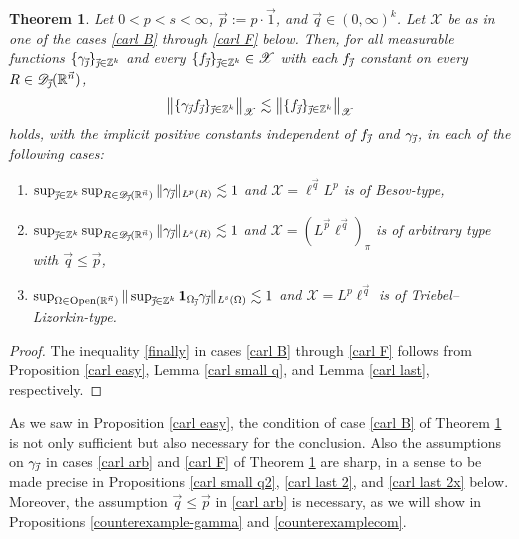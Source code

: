 \documentclass[11pt, reqno]{amsart}
\newtheorem{theorem}{Theorem}[section]
\theoremstyle{definition}
\theoremstyle{remark}
\numberwithin{equation}{section}
\newcommand{\D}{\mathscr D}
\newcommand{\R}{\mathbb R}
\newcommand{\Xs}{\mathscr X}
\newcommand{\vone}{\vec 1}
\newcommand{\vj}{\vec{\textit{\j}}}
\newcommand{\vn}{\vec n}
\newcommand{\vp}{\vec p}
\newcommand{\vq}{\vec q}
\newcommand{\one}{\mathbf{1}}
\newcommand{\aveL}{\textit{\L}}
\newcommand{\Norm}[2]{\|#1\|_{#2}}
\newcommand{\bNorm}[2]{\big\|#1\big\|_{#2}}
\newcommand{\Open}{\mathrm{Open}}
\begin{document}
\begin{theorem}\label{carl thm}
Let $0<p<s<\infty$, $\vp:=p\cdot\vone$, and $\vq\in(0,\infty)^k$.
Let $\Xs$ be as in one of the cases \eqref{carl B} through \eqref{carl F} below.
Then, for all measurable functions $\{\gamma_{\vj}\}_{\vj\in\mathbb Z^k}$ and
every $\{f_{\vj}\}_{\vj\in\mathbb Z^k}\in \Xs$
with each $f_{\vj}$ constant on every $R\in\D_{\vj}(\R^{\vn})$,
\begin{equation} \label{finally}
\bNorm{\{\gamma_{\vj}f_{\vj}\}_{\vj\in\mathbb Z^k}}{\Xs}
\lesssim \bNorm{\{ f_{\vj}\}_{\vj\in\mathbb Z^k}}{\Xs}
\end{equation}
holds, with the implicit positive constants independent of $f_{\vj}$ and $\gamma_{\vj}$, in each of the following cases:
\begin{enumerate}[\rm(i)]
\item\label{carl B} $\sup_{\vj\in\mathbb Z^k}\sup_{R\in\D_{\vj}(\R^{\vn})}\Norm{\gamma_{\vj}}{\aveL^p(R)}\lesssim 1$ and $\Xs=\ell^{\vq}L^p$ is of Besov-type,

\item\label{carl arb} $\sup_{\vj\in\mathbb Z^k}\sup_{R\in\D_{\vj}(\R^{\vn})}\Norm{\gamma_{\vj}}{\aveL^s(R)}\lesssim 1$ and $\Xs=(L^{\vp}\ell^{\vq})_\pi$ is of arbitrary type with $\vq\leq\vp$,

\item\label{carl F} $\sup_{\Omega\in\Open(\R^{\vn})}\Norm{\sup_{\vj\in\mathbb Z^k}\one_{\Omega_{\vj}}\gamma_{\vj}}{\aveL^s(\Omega)}\lesssim 1$ and $\Xs=L^p\ell^{\vq}$ is of Triebel--Lizorkin-type.
\end{enumerate}
\end{theorem}

\begin{proof}
The inequality \eqref{finally} in cases \eqref{carl B} through \eqref{carl F} follows from
Proposition \ref{carl easy}, Lemma \ref{carl small q},
and Lemma \ref{carl last}, respectively.
\end{proof}

As we saw in Proposition \ref{carl easy}, the condition of case \eqref{carl B} of Theorem \ref{carl thm} is not only sufficient but also necessary for the conclusion.
Also the assumptions on $\gamma_{\vj}$ in cases \eqref{carl arb} and \eqref{carl F} of Theorem \ref{carl thm} are sharp, in a sense to be made precise in Propositions \ref{carl small q2}, \ref{carl last 2}, and \ref{carl last 2x} below. Moreover, the assumption $\vq\leq\vp$ in \eqref{carl arb} is necessary, as we will show in Propositions \ref{counterexample-gamma} and \ref{counterexamplecom}.
\end{document}
